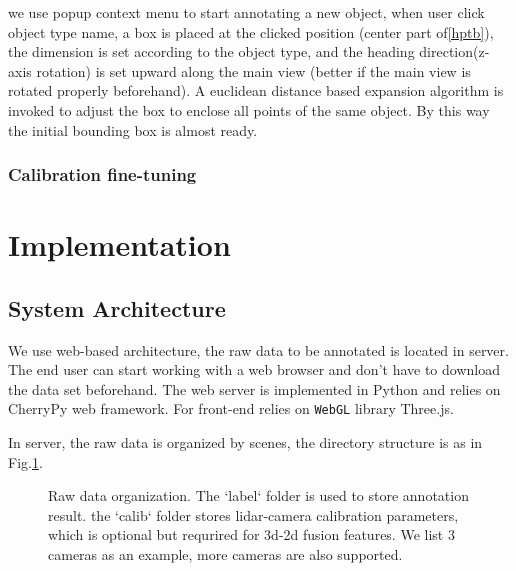 \documentclass[letterpaper, 10 pt, conference]{ieeeconf}  %
\begin{document}
we use popup context menu to start annotating a new object, when user click object type name, a box is placed at the clicked position (center part of\ref{hptb}), the dimension is set according to the object type, and the heading direction(z-axis rotation) is set upward along the main view (better if the main view is rotated properly beforehand).
A euclidean distance based expansion algorithm is invoked to adjust the box to enclose all points of the same object. By this way the initial bounding box is almost ready.

\subsubsection{Calibration fine-tuning}

\section{Implementation}
\label{Implementation}

\subsection{System Architecture}
We use web-based architecture, the raw data to be annotated is located in server. The end user can start working with a web browser and don't have to download the data set beforehand. The web server is implemented in Python and relies on CherryPy web framework\cite{cherrypy}. For front-end relies on \texttt{WebGL} library Three.js\cite{threejs}.

In server, the raw data is organized by scenes, the directory structure is as in Fig.\ref{fig:data-dir}.

\begin{figure}

\caption{Raw data organization. The `label` folder is used to store annotation result. the `calib` folder stores lidar-camera calibration parameters, which is optional but requrired for 3d-2d fusion features. We list 3 cameras as an example, more cameras are also supported.}
\label{fig:data-dir}
\end{figure}
\end{document}
